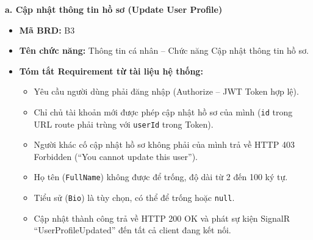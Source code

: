 \documentclass[11pt,a4paper]{article}
\begin{document}
\noindent\textbf{a. Cập nhật thông tin hồ sơ (Update User Profile)}
\begin{itemize}[leftmargin=1.2cm, noitemsep]
    \item[\textbf{--}] \textbf{Mã BRD:} B3
    \item[\textbf{--}] \textbf{Tên chức năng:} Thông tin cá nhân -- Chức năng Cập nhật thông tin hồ sơ.
    \item[\textbf{--}] \textbf{Tóm tắt Requirement từ tài liệu hệ thống:}
    \begin{itemize}[leftmargin=0.8cm, label=$\bullet$, noitemsep]
        \item Yêu cầu người dùng phải đăng nhập (Authorize -- JWT Token hợp lệ).
        \item Chỉ chủ tài khoản mới được phép cập nhật hồ sơ của mình (\texttt{id} trong URL route phải trùng với \texttt{userId} trong Token).
        \item Người khác cố cập nhật hồ sơ không phải của mình trả về HTTP 403 Forbidden (``You cannot update this user'').
        \item Họ tên (\texttt{FullName}) không được để trống, độ dài từ 2 đến 100 ký tự.
        \item Tiểu sử (\texttt{Bio}) là tùy chọn, có thể để trống hoặc \texttt{null}.
        \item Cập nhật thành công trả về HTTP 200 OK và phát sự kiện SignalR ``UserProfileUpdated'' đến tất cả client đang kết nối.
    \end{itemize}
\end{itemize}
\end{document}
